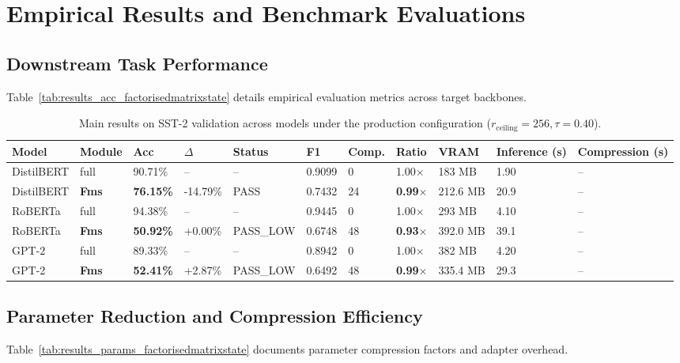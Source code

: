 \section{Empirical Results and Benchmark Evaluations}

\subsection{Downstream Task Performance}
Table~\ref{tab:results_acc_factorisedmatrixstate} details empirical evaluation metrics across target backbones.

\begin{table}[t]
\centering
\small
\begin{tabular}{lllllllllll}
\toprule
\textbf{Model} & \textbf{Module} & \textbf{Acc} & \textbf{$\Delta$} & \textbf{Status} & \textbf{F1} & \textbf{Comp.} & \textbf{Ratio} & \textbf{VRAM} & \textbf{Inference (s)} & \textbf{Compression (s)} \\
\midrule
DistilBERT & full & 90.71\% & -- & -- & 0.9099 & 0 & 1.00$\times$ & 183 MB & 1.90 & -- \\
DistilBERT & \textbf{Fms} & \textbf{76.15\%} & -14.79\% & PASS & 0.7432 & 24 & \textbf{0.99$\times$} & 212.6 MB & 20.9 & -- \\
RoBERTa & full & 94.38\% & -- & -- & 0.9445 & 0 & 1.00$\times$ & 293 MB & 4.10 & -- \\
RoBERTa & \textbf{Fms} & \textbf{50.92\%} & +0.00\% & PASS_LOW & 0.6748 & 48 & \textbf{0.93$\times$} & 392.0 MB & 39.1 & -- \\
GPT-2 & full & 89.33\% & -- & -- & 0.8942 & 0 & 1.00$\times$ & 382 MB & 4.20 & -- \\
GPT-2 & \textbf{Fms} & \textbf{52.41\%} & +2.87\% & PASS_LOW & 0.6492 & 48 & \textbf{0.99$\times$} & 335.4 MB & 29.3 & -- \\
\bottomrule
\end{tabular}
\caption{Main results on SST-2 validation across models under the production configuration ($r_{\mathrm{ceiling}}=256, \tau=0.40$).}
\label{tab:main_sst2}
\end{table}

\subsection{Parameter Reduction and Compression Efficiency}
Table~\ref{tab:results_params_factorisedmatrixstate} documents parameter compression factors and adapter overhead.

